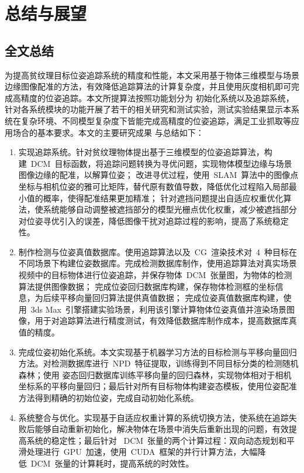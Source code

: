 \chapter{总结与展望}
\label{cha:all:final}
\section{全文总结}
\label{sec:all:summary}
为提高贫纹理目标位姿追踪系统的精度和性能，本文采用基于物体三维模型与场景边缘图像配准的方法，有效降低追踪算法的计算复杂度，并且使用灰度相机即可完成高精度的位姿追踪。本文所提算法按照功能划分为
初始化系统以及追踪系统，针对各系统模块的功能开展了若干的相关研究和测试实验，测试实验结果显示本系统在复杂环境、不同模型复杂度下皆能完成高精度的位姿追踪，满足工业抓取等应用场合的基本要求。本文的主要研究成果
与总结如下：
\begin{enumerate}
    \item 实现追踪系统。针对贫纹理物体提出基于三维模型的位姿追踪算法，构建~DCM~目标函数，将追踪问题转换为寻优问题，实现物体模型边缘与场景图像边缘的配准，以解算位姿；
    改进寻优过程，使用~SLAM~算法中的图像点坐标与相机位姿的雅可比矩阵，替代原有数值导数，降低优化过程陷入局部最小值的概率，使得配准结果更加精准；
    针对遮挡问题提出自适应权重优化算法，使系统能够自动调整被遮挡部分的模型光栅点优化权重，减少被遮挡部分对位姿寻优引入的误差，降低图像干扰对追踪过程的影响，提高了系统稳定性。
    \item 制作检测与位姿真值数据库。使用追踪算法以及~CG~渲染技术对~4~种目标在不同场景下构建位姿数据库。完成检测数据库制作，使用追踪算法对真实场景视频中的目标物体进行位姿追踪，并保存物体~DCM~张量图，为物体的检测算法提供图像数据；
    完成位姿回归数据库构建，保存物体检测框的坐标信息，为后续平移向量回归算法提供真值数据；
    完成位姿真值数据库构建，使用~3ds Max~引擎搭建实验场景，利用该引擎计算物体位姿真值并渲染场景图像，用于对追踪算法进行精度测试，有效降低数据库制作成本，提高数据库真值的精度。
    \item 完成位姿初始化系统。本文实现基于机器学习方法的目标检测与平移向量回归方法。对检测数据库进行~NPD~特征提取，训练得到不同目标分类的检测随机森林；使用
    姿态回归数据库训练平移向量的回归森林，实现物体相对于相机坐标系的平移向量回归；最后针对所有目标物体构建姿态模板，使用位姿配准方法得到精确的初始位姿，完成自动初始化系统。
    \item 系统整合与优化。实现基于自适应权重计算的系统切换方法，使系统在追踪失败后能够自动重新初始化，解决物体在场景中消失后重新出现的问题，有效提高系统的稳定性；最后针对
    ~DCM~张量的两个计算过程：双向动态规划和平滑处理进行~GPU~加速，使用~CUDA~框架的并行计算方法，大幅降低~DCM~张量的计算耗时，提高系统的时效性。

\end{enumerate}
